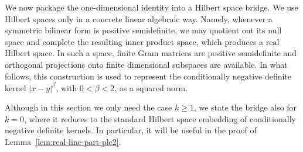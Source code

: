 \documentclass[11pt]{article}
\theoremstyle{definition}
\begin{document}
We now package the one-dimensional identity into a Hilbert space bridge. We use
Hilbert spaces only in a concrete linear algebraic way. Namely, whenever a
symmetric bilinear form is positive semidefinite, we may quotient out its null
space and complete the resulting inner product space, which produces a real
Hilbert space. In such a space, finite Gram matrices are positive semidefinite
and orthogonal projections onto finite dimensional subspaces are available. In
what follows, this construction is used to represent the conditionally negative
definite kernel \(|x-y|^\beta\), with \(0<\beta<2\), as a squared norm.

Although in this section we only need the case \(k\ge1\), we state the bridge
also for \(k=0\), where it reduces to the standard Hilbert space embedding of
conditionally negative definite kernels. In particular, it will be useful in the
proof of Lemma~\ref{lem:real-line-part-ple2}.
\end{document}
